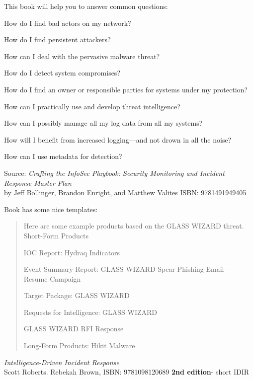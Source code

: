 \documentclass[Screen16to9,17pt]{foils}
\begin{document}


This book will help you to answer common questions:
\begin{list2}
\item How do I find bad actors on my network?
\item How do I find persistent attackers?
\item How can I deal with the pervasive malware threat?
\item How do I detect system compromises?
\item How do I find an owner or responsible parties for systems under my protection?
\item How can I practically use and develop threat intelligence?
\item How can I possibly manage all my log data from all my systems?
\item How will I benefit from increased logging—and not drown in all the noise?
\item How can I use metadata for detection?
\end{list2}
Source: \emph{Crafting the InfoSec Playbook: Security Monitoring and Incident Response Master Plan}\\
 by Jeff Bollinger, Brandon Enright, and Matthew Valites ISBN: 9781491949405



Book has some nice templates:
\begin{quote}
Here are some example products based on the GLASS WIZARD threat.
Short-Form Products
\begin{list2}
\item IOC Report: Hydraq Indicators
\item Event Summary Report: GLASS WIZARD Spear Phishing Email—
Resume Campaign
\item Target Package: GLASS WIZARD
\item Requests for Intelligence: GLASS WIZARD
\item GLASS WIZARD RFI Response
\end{list2}

Long-Form Products: Hikit Malware
\end{quote}




\emph{Intelligence-Driven Incident Response} \\
  Scott Roberts. Rebekah Brown, ISBN: 9781098120689 {\bf 2nd edition}- short IDIR
\end{document}
